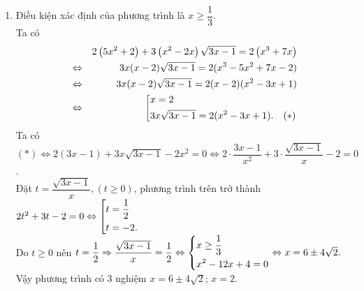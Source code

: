 \begin{bt}
{\begin{enumerate}
			Phương trình đã cho tương đương
			\begin{align*}
			x^2 - 2x + 13 = 4\sqrt{(4 - x)(x + 2)} \Leftrightarrow x^2 - 2x + 13 = 4\sqrt{-x^2 + 2x + 8}
			\end{align*}
			Đặt $t = \sqrt{-x^2 + 2x + 8}$ (Điều kiện $t \geq 0$). Ta có phương trình
			\begin{align*}
			8 - t^2 + 13 = 4t \Leftrightarrow t^2 + 4t - 21 = 0 \Leftrightarrow \hoac{t&= -7\\ t&= 3.}
			\end{align*}
			Kết hợp điều kiện ta được $t = 3$.\\ 
			Với $t = 3 \Rightarrow \sqrt{-x^2 + 2x + 8} = 3 \Leftrightarrow -x^2 + 2x + 8 = 9 \Leftrightarrow (x - 1)^2 = 0 \Leftrightarrow x = 1$ (nhận).
			Vậy phương trình đã cho có nghiệm duy nhất $x=1$.
			\item Điều kiện xác định của phương trình là $x \geq \dfrac{1}{3}$. \\
			Ta có
			\begin{eqnarray*}
				&& 2\left( 5x^2+2\right) +3 \left( x^2 -2x\right) \sqrt{3x-1} =2 \left( x^3 +7x\right)\\
				&\Leftrightarrow & 3x(x-2) \sqrt{3x-1} = 2(x^3-5x^2+7x-2)\\
				&\Leftrightarrow & 3x(x-2) \sqrt{3x-1} =2(x-2)(x^2-3x+1)\\
				&\Leftrightarrow & \left[\begin{aligned}&x=2\\&3x\sqrt{3x-1}=2(x^2-3x+1).\quad (*)\end{aligned}\right.
			\end{eqnarray*}
			Ta có $(*) \Leftrightarrow 2(3x-1)+3x \sqrt{3x-1}-2x^2 =0 \Leftrightarrow 2 \cdot \dfrac{3x-1}{x^2}+3 \cdot \dfrac{\sqrt{3x-1}}{x}-2=0$.\\
			Đặt $t= \dfrac{\sqrt{3x-1}}{x}, (t \geq 0)$, phương trình trên trở thành $2t^2+3t-2=0 \Leftrightarrow \left[\begin{aligned}&t=\dfrac{1}{2}\\& t=-2.\end{aligned}\right.$ \\
			Do $t \geq 0$ nên $t = \dfrac{1}{2} \Rightarrow \dfrac{\sqrt{3x-1}}{x} =\dfrac{1}{2} \Leftrightarrow \left\{\begin{aligned} &x\geq \dfrac{1}{3}\\& x^2-12x+4=0\end{aligned}\right. \Leftrightarrow x= 6\pm 4\sqrt{2}.$\\
			Vậy phương trình có 3 nghiệm $x=6 \pm 4\sqrt{2}$; $x=2$.
		\end{enumerate}
	}
\end{bt}

